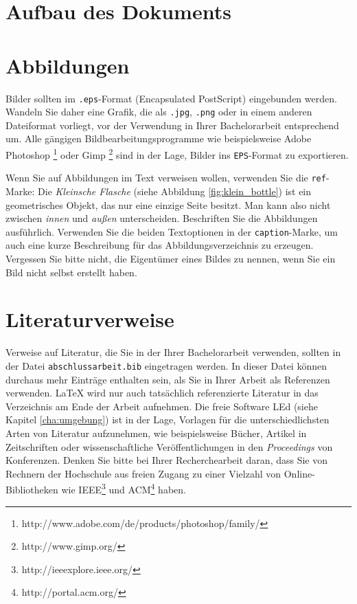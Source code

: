\section{Aufbau des Dokuments}
\label{sec:aufbau}
%

%
%
%
%
%
\section{Abbildungen}
\label{sec:abbildungen}
%
Bilder sollten im \texttt{.eps}-Format (Encapsulated PostScript) eingebunden werden. Wandeln Sie daher eine Grafik, die als \texttt{.jpg}, \texttt{.png} oder in einem anderen Dateiformat vorliegt, vor der Verwendung in Ihrer Bachelorarbeit entsprechend um. Alle gängigen Bildbearbeitungsprogramme wie beispielsweise Adobe Photoshop \footnote{http://www.adobe.com/de/products/photoshop/family/} oder Gimp \footnote{http://www.gimp.org/} sind in der Lage, Bilder ins \texttt{EPS}-Format zu exportieren.
%


%
Wenn Sie auf Abbildungen im Text verweisen wollen, verwenden Sie die \texttt{ref}-Marke: Die \textit{Kleinsche Flasche} \cite{schrijver89} (siehe Abbildung \ref{fig:klein_bottle}) ist ein geometrisches Objekt, das nur eine einzige Seite besitzt. Man kann also nicht zwischen \textit{innen} und \textit{außen} unterscheiden. Beschriften Sie die Abbildungen ausführlich. Verwenden Sie die beiden Textoptionen in der \texttt{caption}-Marke, um auch eine kurze Beschreibung für das Abbildungsverzeichnis zu erzeugen. \\
%
Vergessen Sie bitte nicht, die Eigentümer eines Bildes zu nennen, wenn Sie ein Bild nicht selbst erstellt haben. \\
%
%
%
%
%
\section{Literaturverweise}
\label{sec:verweise}
%
Verweise auf Literatur, die Sie in der Ihrer Bachelorarbeit verwenden, sollten in der Datei \texttt{abschlussarbeit.bib} eingetragen werden. In dieser Datei können durchaus mehr Einträge enthalten sein, als Sie in Ihrer Arbeit als Referenzen verwenden. LaTeX wird nur auch tatsächlich referenzierte Literatur in das Verzeichnis am Ende der Arbeit aufnehmen. Die freie Software LEd (siehe Kapitel \ref{cha:umgebung}) ist in der Lage, Vorlagen für die unterschiedlichsten Arten von Literatur aufzunehmen, wie beispielsweise Bücher, Artikel in Zeitschriften oder wissenschaftliche Veröffentlichungen in den \textit{Proceedings} von Konferenzen. Denken Sie bitte bei Ihrer Recherchearbeit daran, dass Sie von Rechnern der Hochschule aus freien Zugang zu einer Vielzahl von Online-Bibliotheken wie IEEE\footnote{http://ieeexplore.ieee.org/} und ACM\footnote{http://portal.acm.org/} haben.
%
%
%
%
%
